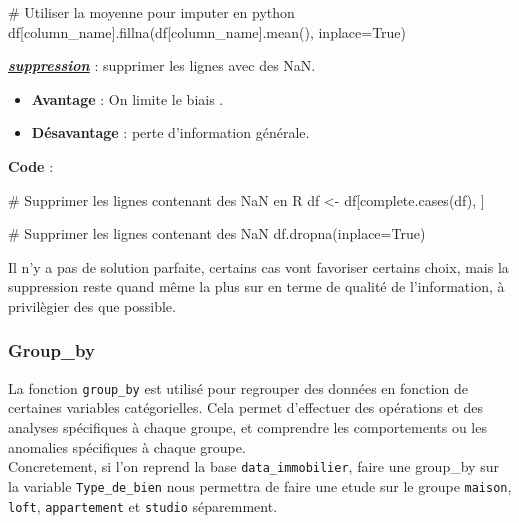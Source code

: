 \documentclass[
  letterpaper,
  DIV=11,
  numbers=noendperiod]{scrartcl}
\newenvironment{Shaded}{\begin{snugshade}}{\end{snugshade}}
\newcommand{\AttributeTok}[1]{\textcolor[rgb]{0.40,0.45,0.13}{#1}}
\newcommand{\CommentTok}[1]{\textcolor[rgb]{0.37,0.37,0.37}{#1}}
\newcommand{\FunctionTok}[1]{\textcolor[rgb]{0.28,0.35,0.67}{#1}}
\newcommand{\NormalTok}[1]{\textcolor[rgb]{0.00,0.23,0.31}{#1}}
\newcommand{\OtherTok}[1]{\textcolor[rgb]{0.00,0.23,0.31}{#1}}
\newcommand{\StringTok}[1]{\textcolor[rgb]{0.13,0.47,0.30}{#1}}
\providecommand{\tightlist}{%
  \setlength{\itemsep}{0pt}\setlength{\parskip}{0pt}}\usepackage{longtable,booktabs,array}
\begin{document}
\begin{Shaded}
\begin{Highlighting}[]
\CommentTok{\# Utiliser la moyenne pour imputer en python}
\NormalTok{df[}\StringTok{\textquotesingle{}column\_name\textquotesingle{}}\NormalTok{]}\FunctionTok{.fillna}\NormalTok{(df[}\StringTok{\textquotesingle{}column\_name\textquotesingle{}}\NormalTok{]}\FunctionTok{.mean}\NormalTok{(), }\AttributeTok{inplace=}\NormalTok{True)}
\end{Highlighting}
\end{Shaded}

\ul{\textbf{\emph{suppression}}} : supprimer les lignes avec des NaN.

\begin{itemize}
\tightlist
\item
  \textbf{Avantage} : On limite le biais .
\item
  \textbf{Désavantage} : perte d'information générale.
\end{itemize}

\textbf{Code} :

\begin{Shaded}
\begin{Highlighting}[]
\CommentTok{\# Supprimer les lignes contenant des NaN en R}
\NormalTok{df }\OtherTok{\textless{}{-}}\NormalTok{ df[}\FunctionTok{complete.cases}\NormalTok{(df), ]}
\end{Highlighting}
\end{Shaded}

\begin{Shaded}
\begin{Highlighting}[]
\CommentTok{\# Supprimer les lignes contenant des NaN }
\FunctionTok{df.dropna}\NormalTok{(}\AttributeTok{inplace=}\NormalTok{True)}
\end{Highlighting}
\end{Shaded}

Il n'y a pas de solution parfaite, certains cas vont favoriser certains
choix, mais la suppression reste quand même la plus sur en terme de
qualité de l'information, à privilègier des que possible.

\subsubsection{Group\_by}\label{group_by}

La fonction \texttt{group\_by} est utilisé pour regrouper des données en
fonction de certaines variables catégorielles. Cela permet d'effectuer
des opérations et des analyses spécifiques à chaque groupe, et
comprendre les comportements ou les anomalies spécifiques à chaque
groupe.\\
Concretement, si l'on reprend la base \texttt{data\_immobilier}, faire
une group\_by sur la variable \texttt{Type\_de\_bien} nous permettra de
faire une etude sur le groupe \texttt{maison}, \texttt{loft},
\texttt{appartement} et \texttt{studio} séparemment.
\end{document}
